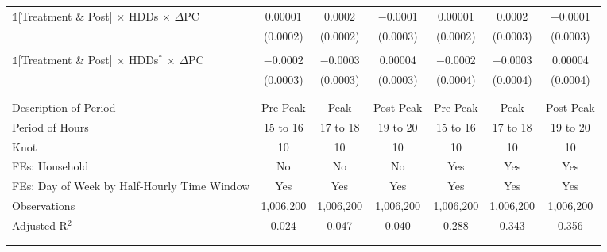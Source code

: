 \begin{ThreePartTable}
\begin{longtable}{@{\extracolsep{0pt}}lcccccc}
            $\mathbb{1}$[Treatment \& Post] $\times$ HDDs $\times$ $\Delta$PC & 0.00001 & 0.0002 & $-$0.0001 & 0.00001 & 0.0002 & $-$0.0001 \\ 
            & (0.0002) & (0.0002) & (0.0003) & (0.0002) & (0.0003) & (0.0003) \\ 
            & & & & & & \\ 
            $\mathbb{1}$[Treatment \& Post] $\times$ HDDs$^{*}$ $\times$ $\Delta$PC & $-$0.0002 & $-$0.0003 & 0.00004 & $-$0.0002 & $-$0.0003 & 0.00004 \\ 
            & (0.0003) & (0.0003) & (0.0003) & (0.0004) & (0.0004) & (0.0004) \\ 
            & & & & & & \\
            \hline
            \\[-2.0ex]
            Description of Period & Pre-Peak & Peak & Post-Peak & Pre-Peak & Peak & Post-Peak \\ 
            Period of Hours & 15 to 16 & 17 to 18 & 19 to 20 & 15 to 16 & 17 to 18 & 19 to 20 \\ 
            Knot & 10 & 10 & 10 & 10 & 10 & 10 \\ 
            FEs: Household & No & No & No & Yes & Yes & Yes \\ 
            FEs: Day of Week by Half-Hourly Time Window & Yes & Yes & Yes & Yes & Yes & Yes \\ 
            Observations & 1,006,200 & 1,006,200 & 1,006,200 & 1,006,200 & 1,006,200 & 1,006,200 \\ 
            Adjusted R$^{2}$ & 0.024 & 0.047 & 0.040 & 0.288 & 0.343 & 0.356 \\
            \\[-2.0ex]
            \hline \hline
            \\[-4.5ex]

        \end{longtable}
    \end{ThreePartTable}
